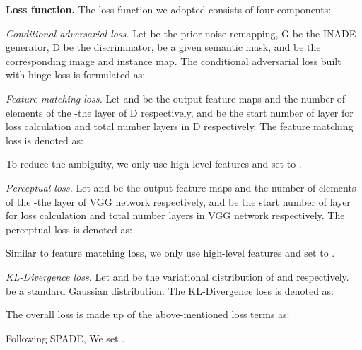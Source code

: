 \documentclass[final]{cvpr}
\begin{document}
\noindent\textbf{Loss function.} The loss function we adopted consists of four components:

\textit{Conditional adversarial loss.} Let  be the prior noise remapping, G be the INADE generator, D be the discriminator,  be a given semantic mask,  and  be the corresponding image and instance map. The conditional adversarial loss built with hinge loss is formulated as:


\textit{Feature matching loss.} Let  and  be the output feature maps and the number of elements of the -the layer of D respectively,  and  be the start number of layer for loss calculation and total number layers in D respectively. The feature matching loss is denoted as:

To reduce the ambiguity, we only use high-level features and set  to .

\textit{Perceptual loss.} Let  and  be the output feature maps and the number of elements of the -the layer of VGG network respectively,  and  be the start number of layer for loss calculation and total number layers in VGG network respectively. The perceptual loss is denoted as:

Similar to feature matching loss, we only use high-level features and set  to .

\textit{KL-Divergence loss.} Let  and  be the variational distribution of  and  respectively.  be a standard Gaussian distribution. The KL-Divergence loss is denoted as:


The overall loss is made up of the above-mentioned loss terms as:

Following SPADE, We set . 
\end{document}
